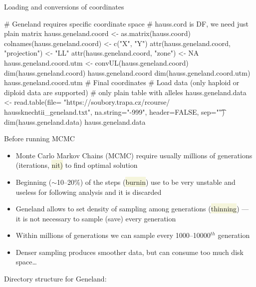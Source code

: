 \documentclass[compress, xelatex, 11pt, xcolor=svgnames, aspectratio=169,
	hyperref={
		bookmarks=true,
		unicode=true,
		colorlinks=true,
		pdftitle={Molecular data in R},
		plainpages=false,
		pdfauthor={Vojtech Zeisek},
		pdfsubject={Course about phylogeny and evolution in R},
		pdfcreator={XeLaTeX},
		pdfkeywords={R, evolution, phylogeny, molecular data},
		linkcolor=Crimson, %
		anchorcolor=Magenta, %
		citecolor=Magenta, %
		filecolor=Magenta, %
		menucolor=Magenta, %
		urlcolor=DodgerBlue, %
		},
	url={hyphens, lowtilde} %
	]{beamer}
\renewcommand{\texttt}[1]{\colorbox{Beige}{{\ttfamily #1}}}
\begin{document}
\begin{frame}[fragile]{Loading and conversions of coordinates}
	\begin{spluscode}
    # Geneland requires specific coordinate space
    # hauss.cord is DF, we need just plain matrix
    hauss.geneland.coord <- as.matrix(hauss.coord)
    colnames(hauss.geneland.coord) <- c("X", "Y")
    attr(hauss.geneland.coord, "projection") <- "LL"
    attr(hauss.geneland.coord, "zone") <- NA
    hauss.geneland.coord.utm <- convUL(hauss.geneland.coord)
    dim(hauss.geneland.coord)
    hauss.geneland.coord
    dim(hauss.geneland.coord.utm)
    hauss.geneland.coord.utm # Final coordinates
    # Load data (only haploid or diploid data are supported)
    # only plain table with alleles
    hauss.geneland.data <- read.table(file= "https://soubory.trapa.cz/rcourse/
      haussknechtii_geneland.txt", na.string="-999", header=FALSE, sep="\t")
    dim(hauss.geneland.data)
    hauss.geneland.data
	\end{spluscode}
\end{frame}

\begin{frame}{Before running MCMC}
	\begin{multicols}{2}
		\begin{itemize}
			\item Monte Carlo Markov Chains (MCMC) require usually millions of generations (iterations, \texttt{nit)} to find optimal solution
			\item Beginning ($\sim$10--20\%) of the steps (\texttt{burnin}) use to be very unstable and useless for following analysis and it is discarded
			\item Geneland allows to set density of sampling among generations (\texttt{thinning}) --- it is not necessary to sample (save) every generation
			\item Within millions of generations we can sample every 1000--10000$^{th}$ generation
			\item Denser sampling produces smoother data, but can consume too much disk space\ldots
		\end{itemize}
		\vfill
		Directory structure for Geneland:
		\vfill
		\begin{center}
			\texttt{[image: genelad\_dirs.png]}
		\end{center}
		\vfil
	\end{multicols}
\end{frame}
\end{document}
